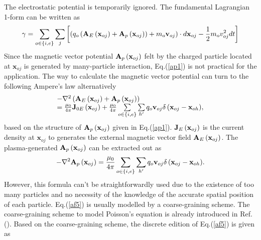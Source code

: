 \documentclass[12pt]{iopart}
\begin{document}
The electrostatic potential is temporarily ignored. The fundamental Lagrangian 1-form can be written as
\begin{equation}\label{af3}
\gamma  = \sum\limits_{o \in \{ i,e\} } {\sum\limits_j {\left[ {\left( {{q_o}\left( {{{\bf{A}}_{E}}\left( {{{\bf{x}}_{oj}}} \right) + {{\bf{A}}_{p}}\left( {{{\bf{x}}_{oj}}} \right)} \right) + {m_o}{{\bf{v}}_{oj}}} \right)\cdot d{{\bf{x}}_{oj}} - \frac{1}{2}{m_o}v_{oj}^2dt} \right]} }
\end{equation}
Since the magnetic vector potential ${{\bf{A}}_{p}}\left( {{{\bf{x}}_{oj}}} \right)$ felt by the charged particle located at $\mathbf{x}_{oj}$ is generated by many-particle interaction, Eq.(\ref{ap1}) is not practical for the application. The way to calculate the magnetic vector potential can turn to the following Ampere's law alternatively
\begin{equation}\label{af4}
\begin{array}{*{20}{l}}
{ - {\nabla ^2}\left( {{{\bf{A}}_E}\left( {{{\bf{x}}_{oj}}} \right) + {{\bf{A}}_p}\left( {{{\bf{x}}_{oj}}} \right)} \right)}\\
{ = \frac{{{\mu _0}}}{{4\pi }}{{\bf{J}}_{0E}}\left( {{{\bf{x}}_{oj}}} \right) + \frac{{{\mu _0}}}{{4\pi }}\sum\limits_{o \in \{ i,e\} } {\sum\limits_{h'} {{q_o}{{\bf{v}}_{oj}}\delta \left( {{{\bf{x}}_{oj}} - {{\bf{x}}_{oh}}} \right)} } ,}
\end{array}
\end{equation}
based on the structure of ${{\bf{A}}_p}\left( {{{\bf{x}}_{oj}}} \right)$ given in Eq.(\ref{ap1}).
${{\bf{J}}_{E}}\left( {{{\bf{x}}_{oj}}} \right)$ is the current density at $\mathbf{x}_{oj}$ to generates the external magnetic vector field ${{{\bf{A}}_{E}}\left( {{{\bf{x}}_{oj}}} \right)}$. The plasma-generated ${{{\bf{A}}_p}\left( {{{\bf{x}}_{oj}}} \right)}$ can be extracted out as
\begin{equation}\label{af5}
- {\nabla ^2}{{\bf{A}}_p}\left( {{{\bf{x}}_{oj}}} \right) = \frac{{{\mu _0}}}{{4\pi }}\sum\limits_{o \in \{ i,e\} } {\sum\limits_{h'} {{q_o}{{\bf{v}}_{oj}}\delta \left( {{{\bf{x}}_{oj}} - {{\bf{x}}_{oh}}} \right)} }.
\end{equation}
However, this formula can't be straightforwardly used due to the existence of too many particles and no necessity of the knowledge of the accurate spatial position of each particle. Eq.(\ref{af5}) is usually modelled by a coarse-graining scheme. The coarse-graining scheme to model Poisson's equation is already introduced in Ref.(\cite{2017shuangxi}). Based on the coarse-graining scheme, the discrete edition of Eq.(\ref{af5}) is given as
\end{document}
